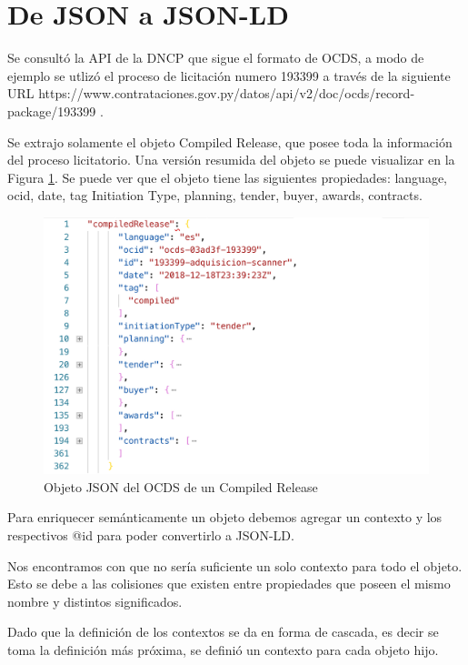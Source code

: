 \section{De JSON a JSON-LD}


Se consultó la API de la DNCP que sigue el formato de OCDS, a modo de ejemplo se utlizó el proceso de licitación numero 193399 a través de la siguiente URL https://www.contrataciones.gov.py/datos/api/v2/doc/ocds/record-package/193399 .

Se extrajo solamente el objeto Compiled Release, que posee toda la información del proceso licitatorio. Una versión resumida del objeto se puede visualizar en la Figura \ref{img:json1}. Se puede ver que el objeto tiene las siguientes propiedades: language, ocid, date, tag Initiation Type, planning, tender, buyer, awards, contracts.



\begin{figure}[h!]
    \centering
    \includegraphics[width=150mm]{figuras/1}
    \caption{Objeto JSON del OCDS de un Compiled Release}
    \label{img:json1}
    \end{figure}



Para enriquecer semánticamente un objeto debemos agregar un contexto y los respectivos @id para poder convertirlo a JSON-LD. 

Nos encontramos con que no sería suficiente un solo contexto para todo el objeto. Esto se debe a las colisiones que existen entre propiedades que poseen el mismo nombre y distintos significados.

Dado que la definición de los contextos se da en forma de cascada, es decir se toma la definición más próxima, se definió un contexto para cada objeto hijo.

